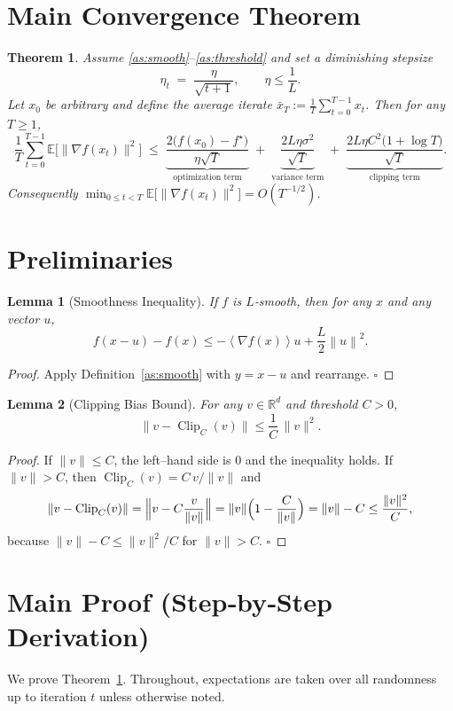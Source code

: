 \documentclass{article}
\newtheorem{theorem}{Theorem}
\newtheorem{lemma}{Lemma}
\newcommand{\E}{\mathbb{E}}
\newcommand{\norm}[1]{\left\lVert #1\right\rVert}
\newcommand{\inner}[1]{\left\langle #1\right\rangle}
\begin{document}
\section*{Main Convergence Theorem}
\begin{theorem}\label{thm:main}
Assume \ref{as:smooth}–\ref{as:threshold} and set a diminishing stepsize
\[
\eta_t \;=\; \frac{\eta}{\sqrt{t+1}},\qquad \eta\le \frac{1}{L}.
\]
Let $x_0$ be arbitrary and define the average iterate
$\displaystyle\bar x_T:=\frac1T\sum_{t=0}^{T-1}x_t$.
Then for any $T\ge1$,
\[
\frac{1}{T}\sum_{t=0}^{T-1}\E\!\bigl[\|\nabla f(x_t)\|^2\bigr]
\;\le\;
\underbrace{\frac{2\bigl(f(x_0)-f^\star\bigr)}{\eta\sqrt{T}}}_{\text{optimization term}}
\;+\;
\underbrace{\frac{2L\eta\sigma^2}{\sqrt{T}}}_{\text{variance term}}
\;+\;
\underbrace{\frac{2L\eta C^{2}\bigl(1+\log T\bigr)}{\sqrt{T}}}_{\text{clipping term}} .
\tag{2}
\]
Consequently $\displaystyle\min_{0\le t<T}\E\!\bigl[\|\nabla f(x_t)\|^2\bigr]=O(T^{-1/2})$.
\end{theorem}

\section*{Preliminaries}
\begin{lemma}[Smoothness Inequality]\label{lem:smooth}
If $f$ is $L$‑smooth, then for any $x$ and any vector $u$,
\[
f(x-u)-f(x) \le -\inner{\nabla f(x)}{u}+\frac{L}{2}\norm{u}^2 .
\]
\end{lemma}
\begin{proof}
Apply Definition~\ref{as:smooth} with $y=x-u$ and rearrange. \hfill $\square$
\end{proof}

\begin{lemma}[Clipping Bias Bound]\label{lem:bias}
For any $v\in\mathbb{R}^d$ and threshold $C>0$,
\[
\|v-\operatorname{Clip}_C(v)\|\le \frac{1}{C}\,\|v\|^2 .
\]
\end{lemma}
\begin{proof}
If $\|v\|\le C$, the left–hand side is $0$ and the inequality holds.
If $\|v\|>C$, then $\operatorname{Clip}_C(v)=C\,v/\|v\|$ and
\[
\|v-\operatorname{Clip}_C(v)\|
= \Bigl\|v-C\frac{v}{\|v\|}\Bigr\|
= \|v\|\Bigl(1-\frac{C}{\|v\|}\Bigr)
= \|v\|-C
\le \frac{\|v\|^2}{C},
\]
because $\|v\|-C\le \|v\|^2/C$ for $\|v\|>C$. \hfill $\square$
\end{proof}

\section*{Main Proof (Step‑by‑Step Derivation)}
We prove Theorem~\ref{thm:main}. Throughout, expectations are taken over all
randomness up to iteration $t$ unless otherwise noted.
\end{document}
